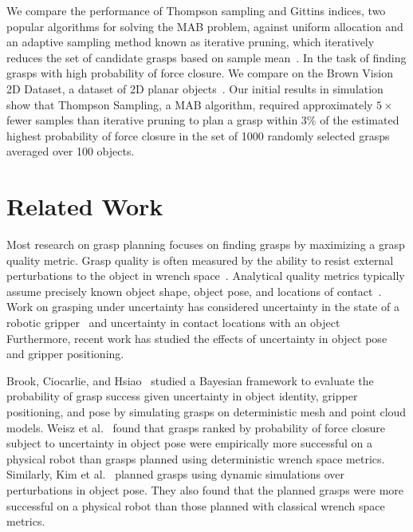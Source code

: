 \documentclass[10pt, conference]{ieeeconf}      %
\begin{document}
We compare the performance of Thompson sampling and Gittins indices, two popular algorithms for solving the MAB problem, against uniform allocation and an adaptive sampling method known as iterative pruning, which iteratively reduces the set of candidate grasps  based on sample mean~\cite{kehoe2012toward}. In the task of finding grasps with high probability of force closure.
We compare on the Brown Vision 2D Dataset, a dataset of 2D planar objects~\cite{brown, christopoulos2007handling}.
Our initial results in simulation show that Thompson Sampling, a MAB algorithm, required approximately $5\times$ fewer samples than iterative pruning to plan a grasp within $3\%$ of the estimated highest probability of force closure in the set of 1000 randomly selected grasps averaged over 100 objects.


\section{Related Work}

Most research on grasp planning focuses on finding grasps by maximizing a grasp quality metric. Grasp quality is often measured by the ability to resist external perturbations to the object in wrench space~\cite{ferrari1992, miller2004graspit}. Analytical quality metrics typically assume precisely known object shape, object pose, and locations of contact~\cite{cheong2011output, ciocarlie2009}. Work on grasping under uncertainty has considered uncertainty in the state of a robotic gripper~\cite{goldberg1990bayesian, stulp2011learning} and uncertainty in contact locations with an object~\cite{zheng2005} Furthermore, recent work has studied the effects of uncertainty in object pose and gripper positioning\cite{brook2011collaborative, hsiao2011bayesian}.

Brook, Ciocarlie, and Hsiao~\cite{brook2011collaborative, hsiao2011bayesian} studied a Bayesian framework to evaluate the probability of grasp success given uncertainty in object identity, gripper positioning, and pose by simulating grasps on deterministic mesh and point cloud models.
Weisz et al.~\cite{weisz2012pose} found that grasps ranked by probability of force closure subject to uncertainty in object pose were empirically more successful on a physical robot than grasps planned using deterministic wrench space metrics. 
Similarly, Kim et al.~\cite{kim2012physically} planned grasps using dynamic simulations over perturbations in object pose. They also found that the planned grasps were more successful on a physical robot than those planned with classical wrench space metrics.
\end{document}
